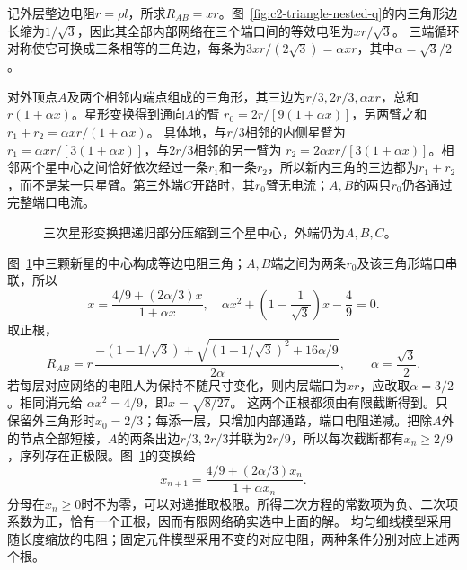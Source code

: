 \begin{solution}
记外层整边电阻$r=\rho l$，所求$R_{AB}=xr$。图~\ref{fig:c2-triangle-nested-q}的内三角形边长缩为$1/\sqrt3$，因此其全部内部网络在三个端口间的等效电阻为$xr/\sqrt3$。
三端循环对称使它可换成三条相等的三角边，每条为$3xr/(2\sqrt3)=\alpha xr$，其中$\alpha=\sqrt3/2$。

对外顶点$A$及两个相邻内端点组成的三角形，其三边为$r/3,2r/3,\alpha xr$，总和$r(1+\alpha x)$。星形变换得到通向$A$的臂
$r_0=2r/[9(1+\alpha x)]$，另两臂之和
$r_1+r_2=\alpha xr/(1+\alpha x)$。
具体地，与$r/3$相邻的内侧星臂为
$r_1=\alpha xr/[3(1+\alpha x)]$，与$2r/3$相邻的另一臂为
$r_2=2\alpha xr/[3(1+\alpha x)]$。相邻两个星中心之间恰好依次经过一条$r_1$和一条$r_2$，所以新内三角的三边都为$r_1+r_2$，而不是某一只星臂。第三外端$C$开路时，其$r_0$臂无电流；$A,B$的两只$r_0$仍各通过完整端口电流。

\begin{figure}[H]\centering
{}
\caption{三次星形变换把递归部分压缩到三个星中心，外端仍为$A,B,C$。}\label{fig:c2-triangle-nested-s}
\end{figure}

图~\ref{fig:c2-triangle-nested-s}中三颗新星的中心构成等边电阻三角；$A,B$端之间为两条$r_0$及该三角形端口串联，所以
\[
 x=\frac{4/9+(2\alpha/3)x}{1+\alpha x},
 \quad\alpha x^2+\left(1-\frac1{\sqrt3}\right)x-\frac49=0.
\]
取正根，
\[
 \boxed{R_{AB}=r\,
 \frac{-(1-1/\sqrt3)+
 \sqrt{(1-1/\sqrt3)^2+16\alpha/9}}{2\alpha}},
 \qquad\alpha=\frac{\sqrt3}{2}.
\]
若每层对应网络的电阻人为保持不随尺寸变化，则内层端口为$xr$，应改取$\alpha=3/2$。相同消元给
$\alpha x^2=4/9$，即$x=\sqrt{8/27}$。
这两个正根都须由有限截断得到。只保留外三角形时$x_0=2/3$；每添一层，只增加内部通路，端口电阻递减。把除$A$外的节点全部短接，$A$的两条出边$r/3,2r/3$并联为$2r/9$，所以每次截断都有$x_n\ge2/9$，序列存在正极限。图~\ref{fig:c2-triangle-nested-s}的变换给
\[
 x_{n+1}=\frac{4/9+(2\alpha/3)x_n}{1+\alpha x_n}.
\]
分母在$x_n\ge0$时不为零，可以对递推取极限。所得二次方程的常数项为负、二次项系数为正，恰有一个正根，因而有限网络确实选中上面的解。
均匀细线模型采用随长度缩放的电阻；固定元件模型采用不变的对应电阻，两种条件分别对应上述两个根。
\end{solution}



